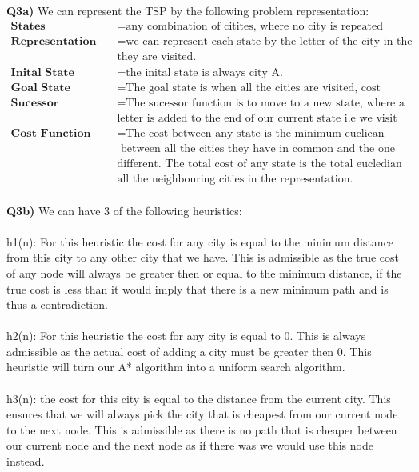\documentclass{article}
\newcommand\tab[1][1cm]{\hspace*{#1}}
\begin{document}
\begin{titlepage}
\newpage
\textbf{Q3a)} We can represent the TSP by the following problem representation:
\begin{align*}
\textbf{States} &= \text{any combination of citites, where no city is repeated twice.} \\
\textbf{Representation} &= \text{we can represent each state by the letter of the city in the order}\\
& \text{they are visited.} \\
\textbf{Inital State} &= \text{the inital state is always city A.} \\
\textbf{Goal State} &= \text{The goal state is when all the cities are visited, cost minimized.} \\
\textbf{Sucessor Function} &= \text{The sucessor function is to move to a new state, where a new city} \\
& \text{letter is added to the end of our current state i.e we visit a new city.} \\
\textbf{Cost Function} &= \text{The cost between any state is the minimum eucliean distance } \\
& \text{ between all the cities they have in common and the one city they have}\\
& \text{different. The total cost of any state is the total eucledian distance between} \\
& \text{all the neighbouring cities in the representation.}
\end{align*}\\
\textbf{Q3b)} We can have 3 of the following heuristics: \\\\
\tab h1(n): For this heuristic the cost for any city is equal to the minimum distance from this city to any other city that we have. This is admissible as the true cost of any node will always be greater then or equal to the minimum distance, if the true cost is less than it would imply that there is a new minimum path and is thus a contradiction. \\\\
\tab h2(n): For this heuristic the cost for any city is equal to 0. This is always admissible as the actual cost of adding a city must be greater then 0. This heuristic will turn our A* algorithm into a uniform search algorithm. \\\\
\tab h3(n): the cost for this city is equal to the distance from the current city. This ensures that we will always pick the city that is cheapest from our current node to the next node. This is admissible as  there is no path that is cheaper between our current node and the next node as if there was we would use this node instead. \\\\

\end{titlepage}
\end{document}
